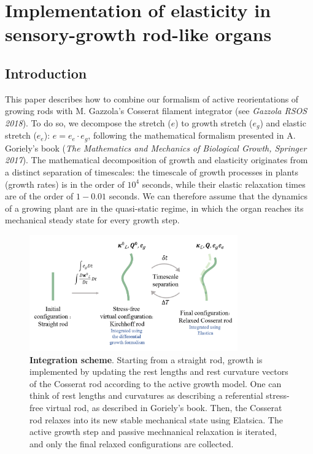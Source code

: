 \documentclass[a4paper, 11pt]{article}
\begin{document}
\section*{Implementation of elasticity in sensory-growth rod-like organs}
\subsection*{Introduction}
This paper describes how to combine our formalism of active reorientations of growing rods with M. Gazzola's Cosserat filament integrator (see \emph{Gazzola RSOS 2018}). To do so, we decompose the stretch ($e$) to growth stretch ($e_g$) and elastic stretch ($e_e$): $e=e_e\cdot e_g$, following the mathematical formalism presented in A. Goriely's book (\emph{The Mathematics and Mechanics of Biological Growth, Springer 2017}). The mathematical decomposition of growth and elasticity originates from a distinct separation of timescales: the timescale of growth processes in plants (growth rates) is in the order of $10^4$ seconds, while their elastic relaxation times are of the order of $1-0.01$ seconds. We can therefore assume that the dynamics of a growing plant are in the quasi-static regime, in which the organ reaches its mechanical steady state for every growth step.

\begin{figure}[h!]
    \centering
    \includegraphics[width=0.80\textwidth]{growth_concept.png}
    \caption{\textbf{Integration scheme}. Starting from a straight rod, growth is implemented by updating the rest lengths and rest curvature vectors of the Cosserat rod according to the active growth model. One can think of rest lengths and curvatures as describing a referential stress-free virtual rod, as described in Goriely's book. Then, the Cosserat rod relaxes into its new stable mechanical state using Elatsica. The active growth step and passive mechnanical relaxation is iterated, and only the final relaxed configurations are collected.} \label{fig:fig1}
\end{figure}
\end{document}
